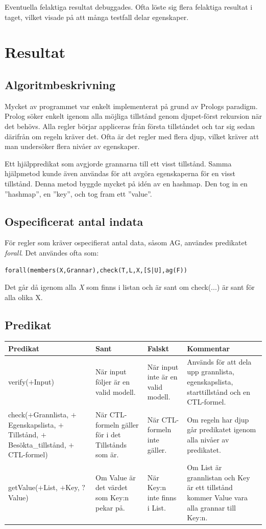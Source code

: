 \documentclass[a4paper]{article}
\begin{document}
Eventuella felaktiga resultat debuggades. Ofta löste sig flera felaktiga resultat i taget, vilket visade på att många testfall delar egenskaper.
\section{Resultat}
\subsection{Algoritmbeskrivning}
Mycket av programmet var enkelt implementerat på grund av Prologs paradigm. Prolog söker enkelt igenom alla möjliga tillstånd genom djupet-först rekursion när det behövs. Alla regler börjar appliceras från första tillståndet och tar sig sedan därifrån om regeln kräver det. Ofta är det regler med flera djup, vilket kräver att man undersöker flera nivåer av egenskaper. 

Ett hjälppredikat som avgjorde grannarna till ett visst tillstånd. Samma hjälpmetod kunde även användas för att avgöra egenskaperna för en visst tillstånd. Denna metod byggde mycket på idén av en hashmap. Den tog in en ''hashmap'', en ''key'', och tog fram ett ''value''. 
\subsection{Ospecificerat antal indata}
För regler som kräver ospecifierat antal data, såsom AG, användes predikatet \emph{forall}. Det användes ofta som:\\
\begin{verbatim}
forall(members(X,Grannar),check(T,L,X,[S|U],ag(F))
\end{verbatim}
Det går då igenom alla \emph{X} som finns i listan och är sant om check(...) är sant för alla olika X.
\subsection{Predikat}
\begin{tabular}{|p{3.1cm}|p{2.75cm}|p{2.75cm}|p{2.75cm}|}
\hline
\textbf{Predikat} & \textbf{Sant} & \textbf{Falskt} & \textbf{Kommentar}\\
\hline
verify($+$Input) & När input följer är en valid modell. & När input inte är en valid modell. & Används för att dela upp grannlista, egenskapslista, starttillstånd och en CTL-formel.\\
\hline
check($+$Grannlista, $+$Egenskapslista, $+$Tillstånd, $+$Besökta\_tillstånd, $+$CTL-formel) & När CTL-formeln gäller för i det Tillstånds som är. & När CTL-formeln inte gäller. & Om regeln har djup går predikatet igenom alla nivåer av predikatet.\\
\hline
getValue($+$List, $+$Key, $?$Value) & Om Value är det värdet som Key:n pekar på.  & När Key:n inte finns i List. & Om List är grannlistan och Key är ett tillstånd kommer Value vara alla grannar till Key:n.\\
\hline
\end{tabular}
\newpage
\end{document}
